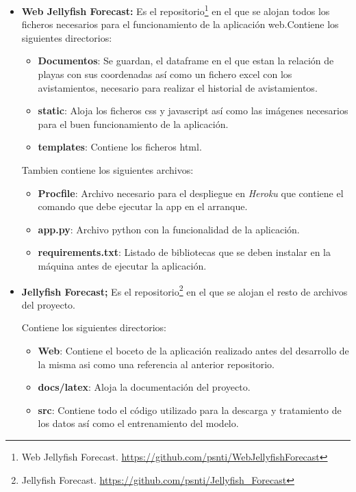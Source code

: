 \begin{itemize}
	\item \textbf{Web Jellyfish Forecast:}
	Es el repositorio\footnote{Web Jellyfish Forecast. \url{https://github.com/psnti/WebJellyfishForecast}} en el que se alojan todos los ficheros necesarios para el funcionamiento de la aplicación web.Contiene los siguientes directorios:
	
	\begin{itemize}
		\item \textbf{Documentos}: Se guardan, el dataframe en el que estan la relación de playas con sus coordenadas así como un fichero excel con los avistamientos, necesario para realizar el historial de avistamientos.
		\item \textbf{static}: Aloja los ficheros css y javascript así como las imágenes necesarios para el buen funcionamiento de la aplicación.
		\item \textbf{templates}: Contiene los ficheros html.
	\end{itemize}
	
	Tambien contiene los siguientes archivos:
	\begin{itemize}
		\item \textbf{Procfile}: Archivo necesario para el despliegue en \emph{Heroku} que contiene el comando que debe ejecutar la app en el arranque.
		\item \textbf{app.py}: Archivo python con la funcionalidad de la aplicación.
		\item \textbf{requirements.txt}: Listado de bibliotecas que se deben instalar en la máquina antes de ejecutar la aplicación.
	\end{itemize}

	\item\textbf{Jellyfish Forecast;}
	Es el repositorio\footnote{Jellyfish Forecast. \url{https://github.com/psnti/Jellyfish_Forecast}} en el que se alojan el resto de archivos del proyecto.
	
	Contiene los siguientes directorios:
	\begin{itemize}
		\item \textbf{Web}: Contiene el boceto de la aplicación realizado antes del desarrollo de la misma asi como una referencia al anterior repositorio.
		\item \textbf{docs/latex}: Aloja la documentación del proyecto.
		\item \textbf{src}: Contiene todo el código utilizado para la descarga y tratamiento de los datos así como el entrenamiento del modelo.
	\end{itemize}
\end{itemize}



